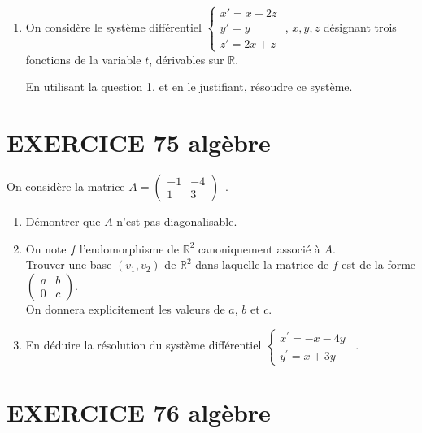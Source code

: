 \documentclass[10pt,oneside]{article}
\begin{document}
\begin{flushleft}
\begin{enumerate}
\begin{enumerate}
	\end{enumerate}
\item On considère le système différentiel $\left\{\begin{array}{l}
 x'=x+2z\\ 
 y'=y \\ 
 z'=2x+z  
\end{array}\right.$ , $x,y,z$ désignant trois fonctions de la variable $t$, dérivables sur $\mathbb{R}$.

En utilisant la question 1. et en le justifiant, résoudre ce système.
\end{enumerate}

\section*{EXERCICE 75 \: algèbre }

On considère la matrice $A=\begin{pmatrix}
-1 & -4 \\ 
1 & 3
\end{pmatrix}$~.

\begin{enumerate}
\item Démontrer que $A$ n'est pas diagonalisable.

\item On note $f$ l'endomorphisme de $\mathbb{R}^{2}$ canoniquement associ\'{e} \`{a} $A$. \\Trouver une base $\left( v_{1},v_{2}\right)$ de $\mathbb{R}^{2}$ dans laquelle la matrice de $f$ est de la forme $\begin{pmatrix}
a & b \\ 
0 & c
\end{pmatrix}$.\\
On donnera explicitement les valeurs de $a$, $b$ et $c$.

\item En déduire la résolution du syst\`{e}me différentiel $\left\{
\begin{array}{l}
x^{\prime }=-x-4y \\ 
y^{\prime }=x+3y
\end{array}
\right.$~.
\end{enumerate}
		
	

\section*{EXERCICE 76 \: algèbre  }


\end{flushleft}
\end{document}
